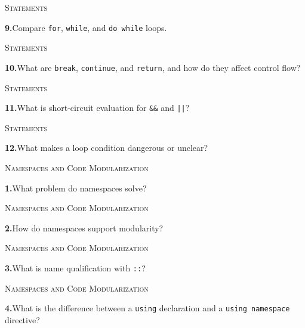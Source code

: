 \documentclass[11pt,a4paper]{article}
\newenvironment{questionblock}{%
  \begin{minipage}[t][0.455\textheight][t]{\textwidth}%
  \raggedright\small
}{%
  \vfill
  \end{minipage}%
}
\newcommand{\sectionlabel}[1]{\textsc{#1}\par\vspace{0.35em}}
\newcommand{\questionnumber}[1]{\textbf{#1.}\enspace}
\begin{document}
\vspace*{0.04\textheight}
\begin{questionblock}
\sectionlabel{Statements}
\questionnumber{9}Compare \verb|for|, \verb|while|, and \verb|do while| loops.\par
\end{questionblock}
\newpage
\begin{questionblock}
\sectionlabel{Statements}
\questionnumber{10}What are \verb|break|, \verb|continue|, and \verb|return|, and how do they affect control flow?\par
\end{questionblock}
\vspace*{0.04\textheight}
\begin{questionblock}
\sectionlabel{Statements}
\questionnumber{11}What is short-circuit evaluation for \verb|&&| and \verb!||!?\par
\end{questionblock}
\newpage
\begin{questionblock}
\sectionlabel{Statements}
\questionnumber{12}What makes a loop condition dangerous or unclear?\par

\end{questionblock}
\vspace*{0.04\textheight}
\begin{questionblock}
\sectionlabel{Namespaces and Code Modularization}
\questionnumber{1}What problem do namespaces solve?\par
\end{questionblock}
\newpage
\begin{questionblock}
\sectionlabel{Namespaces and Code Modularization}
\questionnumber{2}How do namespaces support modularity?\par
\end{questionblock}
\vspace*{0.04\textheight}
\begin{questionblock}
\sectionlabel{Namespaces and Code Modularization}
\questionnumber{3}What is name qualification with \verb|::|?\par
\end{questionblock}
\newpage
\begin{questionblock}
\sectionlabel{Namespaces and Code Modularization}
\questionnumber{4}What is the difference between a \verb|using| declaration and a \verb|using namespace| directive?\par
\end{questionblock}
\end{document}
